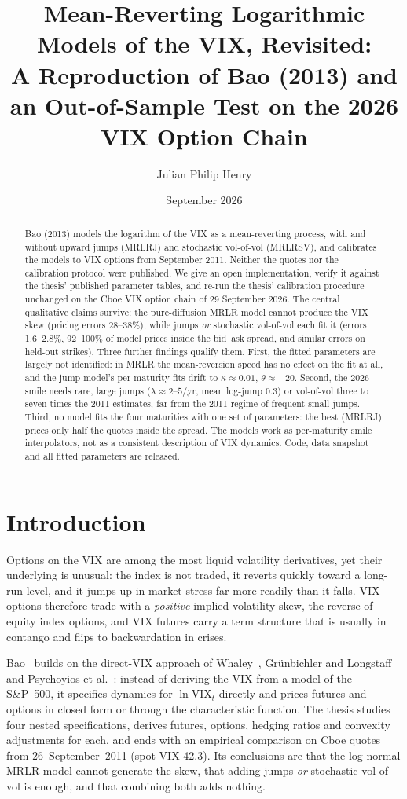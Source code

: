 \documentclass[10pt,twocolumn]{article}
\title{\vspace{-1.8em}Mean-Reverting Logarithmic Models of the VIX, Revisited:\\
\large A Reproduction of Bao (2013) and an Out-of-Sample Test on the 2026 VIX Option Chain}
\author{Julian Philip Henry}
\date{\vspace{-0.6em}September 2026\vspace{-1.4em}}
\newcommand{\VIX}{\mathrm{VIX}}
\begin{document}
\maketitle

\begin{abstract}
\noindent
Bao (2013) models the logarithm of the VIX as a mean-reverting process, with and without
upward jumps (MRLRJ) and stochastic vol-of-vol (MRLRSV), and calibrates the models to
VIX options from September 2011. Neither the quotes nor the calibration protocol were
published. We give an open implementation, verify it against the thesis'
published parameter tables, and re-run the thesis' calibration procedure unchanged on
the Cboe VIX option chain of 29 September 2026. The central qualitative claims survive:
the pure-diffusion MRLR model cannot produce the VIX skew (pricing errors 28--38\%),
while jumps \emph{or} stochastic vol-of-vol each fit it (errors 1.6--2.8\%, 92--100\%
of model prices inside the bid--ask spread, and similar errors on held-out strikes).
Three further findings qualify them. First, the fitted parameters are largely not
identified: in MRLR the mean-reversion speed has no effect on the fit at all, and the
jump model's per-maturity fits drift to $\kappa\approx0.01$, $\theta\approx-20$.
Second, the 2026 smile needs rare, large jumps ($\lambda\approx2$--$5$/yr, mean log-jump
0.3) or vol-of-vol three to seven times the 2011 estimates, far from the 2011
regime of frequent small jumps. Third, no model fits the four maturities
with one set of parameters: the best (MRLRJ) prices only half the quotes inside the
spread. The models work as per-maturity smile interpolators, not as a
consistent description of VIX dynamics. Code, data snapshot and all fitted parameters
are released.
\end{abstract}

\section{Introduction}
Options on the VIX are among the most liquid volatility derivatives, yet their
underlying is unusual: the index is not traded, it reverts quickly toward a long-run
level, and it jumps up in market stress far more readily than it falls. VIX options
therefore trade with a \emph{positive} implied-volatility skew, the reverse of equity
index options, and VIX futures carry a term structure that is usually in contango and
flips to backwardation in crises.

Bao~\citep{bao2013} builds on the direct-VIX approach of
Whaley~\citep{whaley1993}, Gr\"unbichler and Longstaff~\citep{grunbichler1996} and
Psychoyios et al.~\citep{psychoyios2010}: instead of deriving the VIX from a model of
the S\&P~500, it specifies dynamics for $\ln\VIX_t$ directly and prices futures and
options in closed form or through the characteristic function. The thesis
studies four nested specifications, derives futures, options, hedging ratios and
convexity adjustments for each, and ends with an empirical comparison on Cboe quotes
from 26~September~2011 (spot VIX 42.3). Its conclusions are that the log-normal MRLR
model cannot generate the skew, that adding jumps \emph{or} stochastic vol-of-vol is
enough, and that combining both adds nothing.
\end{document}
